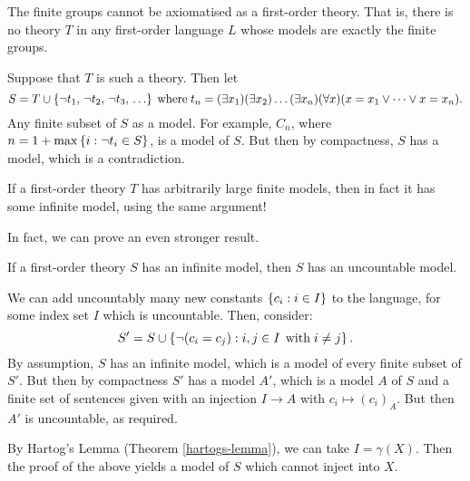 \documentclass{article}
\begin{document}
\begin{proposition}
   The finite groups cannot be axiomatised as a first-order theory. That is, there is no theory $T$ in any first-order language $L$ whose models are exactly the finite groups.
\end{proposition}

\begin{prf}
    Suppose that $T$ is such a theory. Then let
    \[
	S = T \cup \set{\lnot t_1, \, \lnot t_2, \, \lnot t_3, \, \dots}
	\where t_n = (\exists x_1)(\exists x_2)\dots(\exists x_n)(\forall x)(x = x_1 \lor \dots \lor x = x_n).
	\]
	Any finite subset of $S$ as a model. For example, $C_n$, where $n = 1 + \max \left\lbrace i : \lnot t_i \in S \right\rbrace$, is a model of $S$. But then by compactness, $S$ has a model, which is a contradiction.
\end{prf}

\begin{corollary}
    If a first-order theory $T$ has arbitrarily large finite models, then in fact it has some infinite model, using the same argument!
\end{corollary}

In fact, we can prove an even stronger result.

\begin{theorem}
	\label{upward-lowenheim-skolem}
    If a first-order theory $S$ has an infinite model, then $S$ has an uncountable model.
\end{theorem}

\begin{prf}
    We can add uncountably many new constants $\left\lbrace c_i : i \in I \right\rbrace$ to the language, for some index set $I$ which is uncountable. Then, consider:
    \[
	S' = S \cup \left\lbrace \lnot (c_i = c_j) : i, j \in I \mathrel{\, \text{with}} i \neq j \right\rbrace.
	\]
	By assumption, $S$ has an infinite model, which is a model of every finite subset of $S'$. But then by compactness $S'$ has a model $A'$, which is a model $A$ of $S$ and a finite set of sentences given with an injection $I \to A$ with $c_i \mapsto (c_i)_A$. But then $A'$ is uncountable, as required.
\end{prf}

\begin{corollary}
	By Hartog's Lemma (Theorem \ref{hartogs-lemma}), we can take $I = \gamma(X)$. Then the proof of the above yields a model of $S$ which cannot inject into $X$.
\end{corollary}
\end{document}
